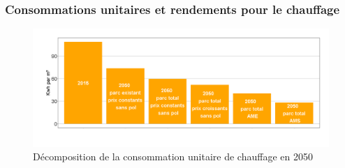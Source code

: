 \documentclass[]{article}
\begin{document}
\subsubsection{Consommations unitaires et rendements pour le
chauffage}\label{consommations-unitaires-et-rendements-pour-le-chauffage}

\begin{figure}
\centering
\includegraphics{Exemple_sortiestertiaire_files/figure-latex/Conso_u_Chauff_evol-1.png}
\caption{Décomposition de la consommation unitaire de chauffage en 2050}
\end{figure}
\end{document}
